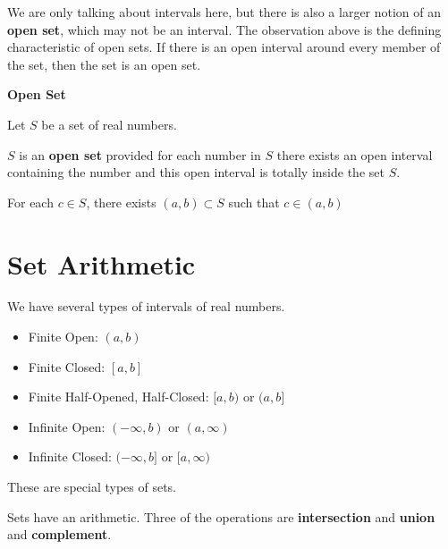 \documentclass{ximera}
\begin{document}
We are only talking about intervals here, but there is also a larger notion of an \textbf{open set}, which may not be an interval.  The observation above is the defining characteristic of open sets.  If there is an open interval around every member of the set, then the set is an open set.




\begin{definition} \textbf{\textcolor{green!50!black}{Open Set}} 


Let $S$ be a set of real numbers. 

$S$ is an \textbf{open set} provided for each number in $S$ there exists an open interval containing the number and this open interval is totally inside the set $S$.

\begin{center}
For each $c \in S$, there exists $(a,b) \subset S$ such that $c \in (a,b)$
\end{center}

\end{definition}







\section*{Set Arithmetic}


We have several types of intervals of real numbers.


\begin{itemize}
\item Finite Open:   $(a, b)$
\item Finite Closed: $[a, b]$
\item Finite Half-Opened, Half-Closed:  $[a, b)$  or $(a,b]$ \\

\item Infinite Open: $(-\infty, b)$ or $(a, \infty)$
\item Infinite Closed: $(-\infty, b]$ or $[a, \infty)$

\end{itemize}

These are special types of sets.


Sets have an arithmetic. Three of the operations are \textbf{intersection} and \textbf{union} and \textbf{complement}.
\end{document}

